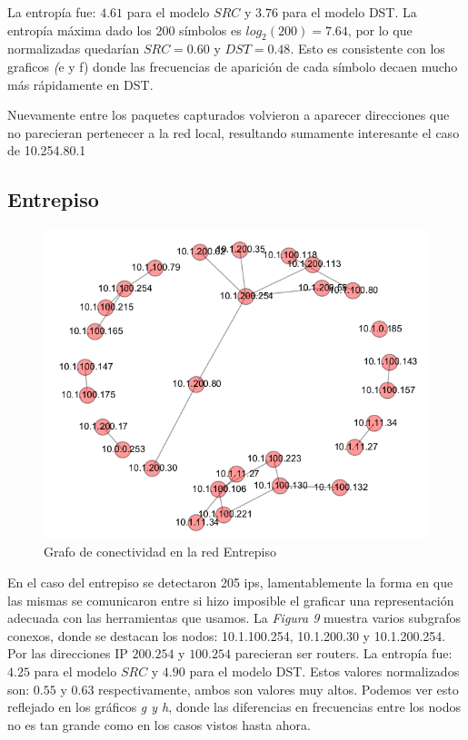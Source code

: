 La entrop\'ia fue: $4.61$ para el modelo $SRC$ y $3.76$ para el modelo
DST. La entrop\'ia m\'axima dado los 200 s\'imbolos es $log_2(200)=7.64$,
por lo que normalizadas quedarían $SRC=0.60$ y $DST=0.48$. Esto es 
consistente con los graficos \emph(e y f) donde las frecuencias de aparici\'on
de cada s\'imbolo decaen mucho m\'as r\'apidamente en DST.

Nuevamente entre los paquetes capturados volvieron a aparecer direcciones que
no parecieran pertenecer a la red local, resultando sumamente interesante el caso
de 10.254.80.1


\subsection{Entrepiso}

\begin{figure}[h!]
    \center
    \includegraphics[scale=0.6]{resultados/entrepiso/conectividadNX.png}
    \caption{Grafo de conectividad en la red Entrepiso}
\end{figure}

En el caso del entrepiso se detectaron 205 ips, lamentablemente la forma en que
las mismas se comunicaron entre si hizo imposible el graficar una representaci\'on
adecuada con las herramientas que usamos. La \emph{Figura 9} muestra
varios subgrafos conexos, donde se destacan los nodos: 10.1.100.254, 10.1.200.30
y 10.1.200.254. Por las direcciones IP $200.254$ y $100.254$ parecieran ser routers.
La entrop\'ia fue: $4.25$ para el
modelo $SRC$ y $4.90$ para el modelo DST. Estos valores normalizados son: 
$0.55$ y $0.63$ respectivamente, ambos son valores muy altos. 
Podemos ver esto reflejado en los gr\'aficos \emph{g y h}, donde las diferencias
en frecuencias entre los nodos no es tan grande como en los casos vistos hasta
ahora.

